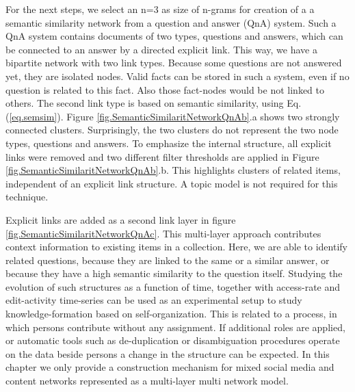 \documentclass[a4paper,10pt]{scrbook}
\begin{document}
For the next steps, we select an n=3 as size of n-grams for creation of a a semantic similarity network from a question and answer (QnA) system. Such a QnA system contains documents of two types, questions and answers, which can be connected to an answer by a directed explicit link. This way, we have a bipartite network with two link types. Because some questions are not answered yet, they are isolated nodes. Valid facts can be stored in such a system, even if no question is related to this fact. Also those fact-nodes would be not linked to others. The second link type is based on semantic similarity, using Eq. (\ref{eq.semsim}). Figure \ref{fig.SemanticSimilaritNetworkQnAb}.a shows two strongly connected clusters. Surprisingly, the two clusters do not represent the two node types, questions and answers. To emphasize the internal structure, all explicit links were removed and two different filter thresholds are applied in Figure \ref{fig.SemanticSimilaritNetworkQnAb}.b. This highlights clusters of related items, independent of an explicit link structure. A topic model is not required for this technique. 

%

\label{ext.fig.SemanticSimilaritNetworkQnAb} 


Explicit links are added as a second link layer in figure \ref{fig.SemanticSimilaritNetworkQnAc}. This multi-layer approach contributes context information to existing items in a collection. Here, we are able to identify related questions, because they are linked to the same or a similar answer, or because they have a high semantic similarity to the question itself. Studying the evolution of such structures as a function of time, together with access-rate and edit-activity time-series can be used as an experimental setup to study knowledge-formation based on self-organization. This is related to a process, in which persons contribute without any assignment. If additional roles are applied, or automatic tools such as de-duplication or disambiguation procedures operate on the data beside persons a change in the structure can be expected. In this chapter we only provide a construction mechanism for mixed social media and content networks represented as a multi-layer multi network model.

\label{ext.fig.SemanticSimilaritNetworkQnAc} 

\end{document}
